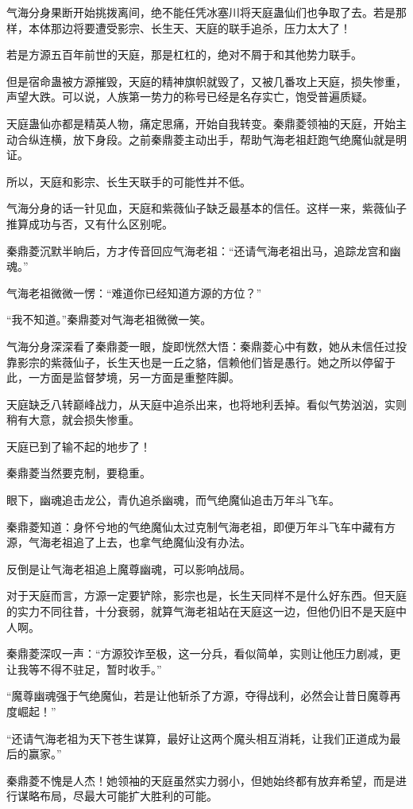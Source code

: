 \begin{this_body}
气海分身果断开始挑拨离间，绝不能任凭冰塞川将天庭蛊仙们也争取了去。若是那样，本体那边将要遭受影宗、长生天、天庭的联手追杀，压力太大了！

若是方源五百年前世的天庭，那是杠杠的，绝对不屑于和其他势力联手。

但是宿命蛊被方源摧毁，天庭的精神旗帜就毁了，又被几番攻上天庭，损失惨重，声望大跌。可以说，人族第一势力的称号已经是名存实亡，饱受普遍质疑。

天庭蛊仙亦都是精英人物，痛定思痛，开始自我转变。秦鼎菱领袖的天庭，开始主动合纵连横，放下身段。之前秦鼎菱主动出手，帮助气海老祖赶跑气绝魔仙就是明证。

所以，天庭和影宗、长生天联手的可能性并不低。

气海分身的话一针见血，天庭和紫薇仙子缺乏最基本的信任。这样一来，紫薇仙子推算成功与否，又有什么区别呢。

秦鼎菱沉默半晌后，方才传音回应气海老祖：“还请气海老祖出马，追踪龙宫和幽魂。”

气海老祖微微一愣：“难道你已经知道方源的方位？”

“我不知道。”秦鼎菱对气海老祖微微一笑。

气海分身深深看了秦鼎菱一眼，旋即恍然大悟：秦鼎菱心中有数，她从未信任过投靠影宗的紫薇仙子，长生天也是一丘之貉，信赖他们皆是愚行。她之所以停留于此，一方面是监督梦境，另一方面是重整阵脚。

天庭缺乏八转巅峰战力，从天庭中追杀出来，也将地利丢掉。看似气势汹汹，实则稍有大意，就会损失惨重。

天庭已到了输不起的地步了！

秦鼎菱当然要克制，要稳重。

眼下，幽魂追击龙公，青仇追杀幽魂，而气绝魔仙追击万年斗飞车。

秦鼎菱知道：身怀兮地的气绝魔仙太过克制气海老祖，即便万年斗飞车中藏有方源，气海老祖追了上去，也拿气绝魔仙没有办法。

反倒是让气海老祖追上魔尊幽魂，可以影响战局。

对于天庭而言，方源一定要铲除，影宗也是，长生天同样不是什么好东西。但天庭的实力不同往昔，十分衰弱，就算气海老祖站在天庭这一边，但他仍旧不是天庭中人啊。

秦鼎菱深叹一声：“方源狡诈至极，这一分兵，看似简单，实则让他压力剧减，更让我等不得不驻足，暂时收手。”

“魔尊幽魂强于气绝魔仙，若是让他斩杀了方源，夺得战利，必然会让昔日魔尊再度崛起！”

“还请气海老祖为天下苍生谋算，最好让这两个魔头相互消耗，让我们正道成为最后的赢家。”

秦鼎菱不愧是人杰！她领袖的天庭虽然实力弱小，但她始终都有放弃希望，而是进行谋略布局，尽最大可能扩大胜利的可能。

\end{this_body}

